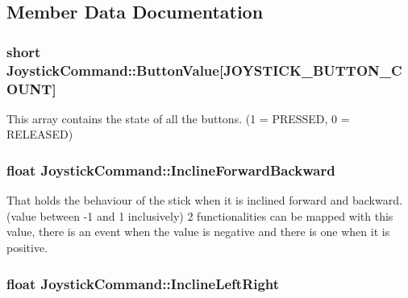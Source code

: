 \subsection{Member Data Documentation}
\subsubsection[{\texorpdfstring{Button\+Value}{ButtonValue}}]{\setlength{\rightskip}{0pt plus 5cm}short Joystick\+Command\+::\+Button\+Value\mbox{[}{\bf J\+O\+Y\+S\+T\+I\+C\+K\+\_\+\+B\+U\+T\+T\+O\+N\+\_\+\+C\+O\+U\+NT}\mbox{]}}\hypertarget{struct_joystick_command_abe14f0b7b117048aa1c7f9626a669035}{}\label{struct_joystick_command_abe14f0b7b117048aa1c7f9626a669035}


This array contains the state of all the buttons. (1 = P\+R\+E\+S\+S\+ED, 0 = R\+E\+L\+E\+A\+S\+ED) 

\subsubsection[{\texorpdfstring{Incline\+Forward\+Backward}{InclineForwardBackward}}]{\setlength{\rightskip}{0pt plus 5cm}float Joystick\+Command\+::\+Incline\+Forward\+Backward}\hypertarget{struct_joystick_command_ac1ac2e83b68ea20eba3e92935b966ba6}{}\label{struct_joystick_command_ac1ac2e83b68ea20eba3e92935b966ba6}


That holds the behaviour of the stick when it is inclined forward and backward. (value between -\/1 and 1 inclusively) 2 functionalities can be mapped with this value, there is an event when the value is negative and there is one when it is positive. 

\subsubsection[{\texorpdfstring{Incline\+Left\+Right}{InclineLeftRight}}]{\setlength{\rightskip}{0pt plus 5cm}float Joystick\+Command\+::\+Incline\+Left\+Right}\hypertarget{struct_joystick_command_a357b7ffd95720084658487aee12662c8}{}\label{struct_joystick_command_a357b7ffd95720084658487aee12662c8}



